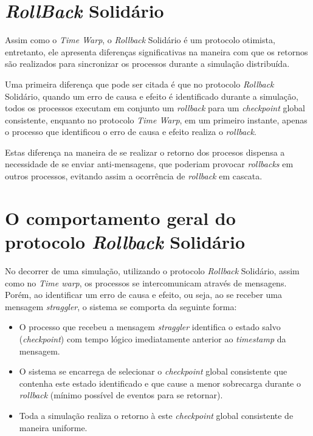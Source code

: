 \section{\textit{RollBack} Solidário}

	Assim como o \textit{Time Warp}, o \textit{Rollback} Solidário é um protocolo otimista, entretanto, ele apresenta diferenças significativas na maneira com que os retornos são realizados para sincronizar os processos durante a simulação distribuída.
	
	Uma primeira diferença que pode ser citada é que no protocolo \textit{Rollback} Solidário, quando um erro de causa e efeito é identificado durante a simulação, todos os processos executam em conjunto um \textit{rollback} para um \textit{checkpoint} global consistente, enquanto no protocolo \textit{Time Warp}, em um primeiro instante, apenas o processo que identificou o erro de causa e efeito realiza o \textit{rollback}.
	
	Estas diferença na maneira de se realizar o retorno dos procesos dispensa a necessidade de se enviar anti-mensagens, que poderiam provocar \textit{rollbacks} em outros processos, evitando assim a ocorrência de \textit{rollback} em cascata.

\section{O comportamento geral do protocolo \textit{Rollback} Solidário}
	No decorrer de uma simulação, utilizando o protocolo \textit{Rollback} Solidário, assim como no \textit{Time warp}, os processos se intercomunicam através de mensagens. Porém, ao identificar um erro de causa e efeito, ou seja, ao se receber uma mensagem \textit{straggler}, o sistema se comporta da seguinte forma:

\begin{itemize}
	\item O processo que recebeu a mensagem \textit{straggler} identifica o estado salvo (\textit{checkpoint}) com tempo lógico imediatamente anterior ao \textit{timestamp} da mensagem.
	\item O sistema se encarrega de selecionar o \textit{checkpoint} global consistente que contenha este estado identificado e que cause a menor sobrecarga durante o  \textit{rollback} (mínimo possível de eventos para se retornar).
	\item Toda a simulação realiza o retorno à este \textit{checkpoint} global consistente de maneira uniforme.
\end{itemize}

